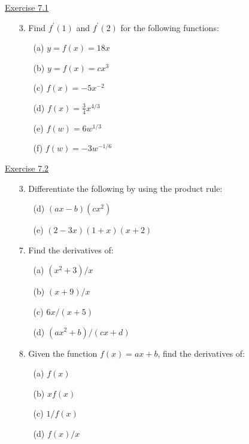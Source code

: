 \underline{Exercise 7.1}
\begin{enumerate}
\item[3.] Find $f^{\prime}(1)$ and $f^{\prime}(2)$ for the following functions:
\begin{multicols}{3}
\begin{enumerate}
\item[(a)] $y=f(x)=18 x$
\item[(b)] $y=f(x)=c x^{3}$
\item[(c)] $f(x)=-5 x^{-2}$
\item[(d)] $f(x)=\frac{3}{4} x^{4 / 3}$
\item[(e)] $f(w)=6 w^{1 / 3}$
\item[(f)] $f(w)=-3 w^{-1 / 6}$
\end{enumerate}
\end{multicols}
\end{enumerate}

\underline{Exercise 7.2}
\begin{enumerate}
\item[3.] Differentiate the following by using the product rule:
\begin{multicols}{2}
\begin{enumerate}
\item[(d)] $(a x-b)\left(c x^{2}\right)$
\item[(e)] $(2-3 x)(1+x)(x+2)$
\end{enumerate}
\end{multicols}

\item[7.] Find the derivatives of:
\begin{multicols}{2}
\begin{enumerate}
\item[(a)] $\left(x^{2}+3\right) / x$
\item[(b)] $(x+9) / x$
\item[(c)] $6 x /(x+5)$
\item[(d)] $\left(a x^{2}+b\right) /(c x+d)$
\end{enumerate}
\end{multicols}

\item[8.] Given the function $f(x)=a x+b$, find the derivatives of:
\begin{multicols}{4}
\begin{enumerate}
\item[(a)] $f(x)$
\item[(b)] $x f(x)$
\item[(c)] $1 / f(x)$
\item[(d)] $f(x) / x$
\end{enumerate}
\end{multicols}
\end{enumerate}

